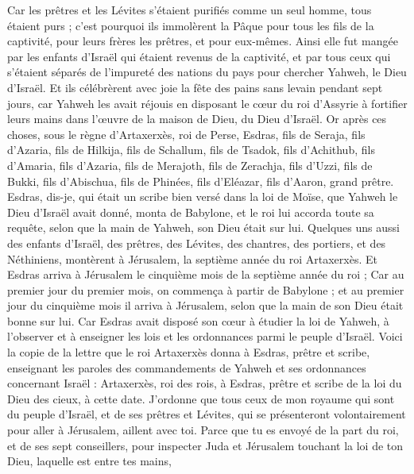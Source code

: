 \begin{multicols}{2}
Car les prêtres et les Lévites s'étaient purifiés comme un seul homme, tous étaient purs ; c'est pourquoi ils immolèrent la Pâque pour tous les fils de la captivité, pour leurs frères les prêtres, et pour eux-mêmes.
Ainsi elle fut mangée par les enfants d'Israël qui étaient revenus de la captivité, et par tous ceux qui s'étaient séparés de l'impureté des nations du pays pour chercher Yahweh, le Dieu d'Israël.
Et ils célébrèrent avec joie la fête des pains sans levain pendant sept jours, car Yahweh les avait réjouis en disposant le cœur du roi d'Assyrie à fortifier leurs mains dans l'œuvre de la maison de Dieu, du Dieu d'Israël.
\VerseOne{}Or après ces choses, sous le règne d'Artaxerxès, roi de Perse, Esdras, fils de Seraja, fils d'Azaria, fils de Hilkija,
fils de Schallum, fils de Tsadok, fils d'Achithub,
fils d'Amaria, fils d'Azaria, fils de Merajoth,
fils de Zerachja, fils d'Uzzi, fils de Bukki,
fils d'Abischua, fils de Phinées, fils d'Eléazar, fils d'Aaron, grand prêtre.
Esdras, dis-je, qui était un scribe bien versé dans la loi de Moïse, que Yahweh le Dieu d'Israël avait donné, monta de Babylone, et le roi lui accorda toute sa requête, selon que la main de Yahweh, son Dieu était sur lui.
Quelques uns aussi des enfants d'Israël, des prêtres, des Lévites, des chantres, des portiers, et des Néthiniens, montèrent à Jérusalem, la septième année du roi Artaxerxès.
Et Esdras arriva à Jérusalem le cinquième mois de la septième année du roi ;
Car au premier jour du premier mois, on commença à partir de Babylone ; et au premier jour du cinquième mois il arriva à Jérusalem, selon que la main de son Dieu était bonne sur lui.
Car Esdras avait disposé son cœur à étudier la loi de Yahweh, à l'observer et à enseigner les lois et les ordonnances parmi le peuple d'Israël.
Voici la copie de la lettre que le roi Artaxerxès donna à Esdras, prêtre et scribe, enseignant les paroles des commandements de Yahweh et ses ordonnances concernant Israël :
Artaxerxès, roi des rois, à Esdras, prêtre et scribe de la loi du Dieu des cieux, à cette date.
J'ordonne que tous ceux de mon royaume qui sont du peuple d'Israël, et de ses prêtres et Lévites, qui se présenteront volontairement pour aller à Jérusalem, aillent avec toi.
Parce que tu es envoyé de la part du roi, et de ses sept conseillers, pour inspecter Juda et Jérusalem touchant la loi de ton Dieu, laquelle est entre tes mains,

\end{multicols}

